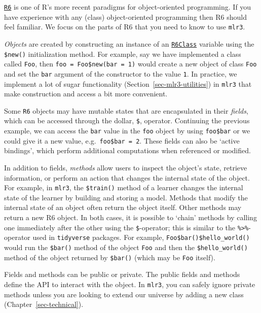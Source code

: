 \href{https://cran.r-project.org/package=R6}{\texttt{R6}} is one of R's
more recent paradigms for object-oriented
programming. If you have experience
with any (class) object-oriented programming then R6 should feel
familiar. We focus on the parts of R6 that you need to know to use
\texttt{mlr3}.

\emph{Objects} are created by constructing an instance of an
\href{https://www.rdocumentation.org/packages/R6/topics/R6Class}{\texttt{R6Class}}
variable using the \texttt{\$new()} initialization method. For example,
say we have implemented a class called \texttt{Foo}, then
\texttt{foo\ =\ Foo\$new(bar\ =\ 1)} would create a new object of class
\texttt{Foo} and set the \texttt{bar} argument of the constructor to the
value \texttt{1}. In practice, we implement a lot of sugar functionality
(Section~\ref{sec-mlr3-utilities}) in \texttt{mlr3} that make
construction and access a bit more convenient.

Some \texttt{R6} objects may have mutable states that are encapsulated
in their \emph{fields}, which can be accessed through the dollar,
\texttt{\$}, operator. Continuing the previous example, we can access
the \texttt{bar} value in the \texttt{foo} object by using
\texttt{foo\$bar} or we could give it a new value,
e.g.~\texttt{foo\$bar\ =\ 2}. These fields can also be `active
bindings', which perform additional computations when referenced or
modified.

In addition to fields, \emph{methods} allow users to inspect the
object's state, retrieve information, or perform an action that changes
the internal state of the object. For example, in \texttt{mlr3}, the
\texttt{\$train()} method of a learner changes the internal state of the
learner by building and storing a model. Methods that modify the
internal state of an object often return the object itself. Other
methods may return a new R6 object. In both cases, it is possible to
`chain' methods by calling one immediately after the other using the
\texttt{\$}-operator; this is similar to the
\texttt{\%\textgreater{}\%}-operator used in \texttt{tidyverse}
packages. For example, \texttt{Foo\$bar()\$hello\_world()} would run the
\texttt{\$bar()} method of the object \texttt{Foo} and then the
\texttt{\$hello\_world()} method of the object returned by
\texttt{\$bar()} (which may be \texttt{Foo} itself).

Fields and methods can be public or private. The public fields and
methods define the API to interact with the object. In \texttt{mlr3},
you can safely ignore private methods unless you are looking to extend
our universe by adding a new class (Chapter~\ref{sec-technical}).

